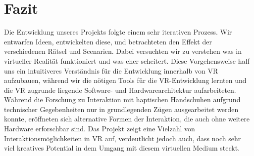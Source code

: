 \newpage
\chapter{Fazit}
Die Entwicklung unseres Projekts folgte einem sehr iterativen Prozess. Wir entwarfen Ideen, entwickelten diese, und betrachteten den Effekt der verschiedenen Rätsel und Scenarien. Dabei versuchten wir zu verstehen was in virtueller Realität funktioniert und was eher scheitert. Diese Vorgehensweise half uns ein intuitiveres Verständnis für die Entwicklung innerhalb von VR aufzubauen, während wir die nötigen Tools für die VR-Entwicklung lernten und die VR zugrunde liegende Software- und Hardwarearchitektur aufarbeiteten.\\ 

Während die Forschung zu Interaktion mit haptischen Handschuhen aufgrund technischer Gegebenheiten nur in grundlegenden Zügen ausgearbeitet werden konnte, eröffneten sich alternative Formen der Interaktion, die auch ohne weitere Hardware erforschbar sind. Das Projekt zeigt eine Vielzahl von Interaktionsmöglichkeiten in VR auf, verdeutlicht jedoch auch, dass noch sehr viel kreatives Potential in dem Umgang mit diesem virtuellen Medium steckt.
